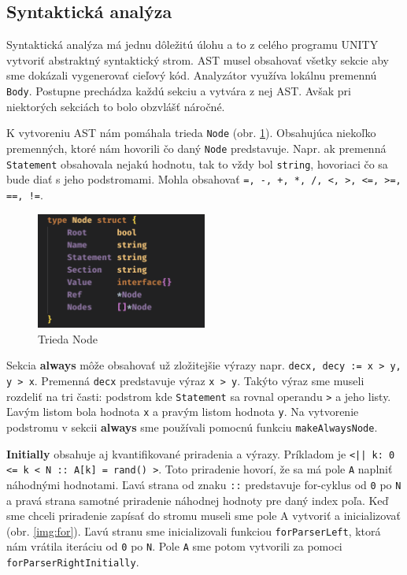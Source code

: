 \subsection{Syntaktická analýza}
Syntaktická analýza má jednu dôležitú úlohu a to z celého programu UNITY vytvoriť abstraktný syntaktický strom.
AST musel obsahovať všetky sekcie aby sme dokázali vygenerovať cieľový kód. Analyzátor využíva lokálnu 
premennú \texttt{Body}. Postupne prechádza každú sekciu a vytvára z nej AST. Avšak pri niektorých sekciách to
bolo obzvlášť náročné. 

K vytvoreniu AST nám pomáhala trieda \texttt{Node} (obr. \ref{img:node}). Obsahujúca niekoľko premenných, ktoré
nám hovorili čo daný \texttt{Node} predstavuje. Napr. ak premenná \texttt{Statement} obsahovala nejakú hodnotu,
tak to vždy bol \texttt{string}, hovoriaci čo sa bude diať s jeho podstromami. Mohla obsahovať 
\texttt{=, -, +, *, /, <, >, <=, >=, ==, !=}.

\begin{figure}[H]
    \centerline{\includegraphics[width=0.5\textwidth]{images/node}}
    \caption[Trieda Node]{Trieda Node}
    \label{img:node}
\end{figure}

Sekcia \textbf{always} môže obsahovať už zložitejšie výrazy napr.
\texttt{decx, decy := x > y, y > x}. Premenná \texttt{decx} predstavuje výraz \texttt{x > y}. 
Takýto výraz sme museli rozdeliť na tri časti: podstrom kde \texttt{Statement} sa rovnal operandu 
\texttt{>} a jeho listy. Ľavým listom bola hodnota \texttt{x} a pravým listom hodnota \texttt{y}. 
Na vytvorenie podstromu v sekcii \textbf{always} sme používali pomocnú funkciu \texttt{makeAlwaysNode}.

\textbf{Initially} obsahuje aj kvantifikované priradenia a výrazy. Príkladom je 
\texttt{<|| k: 0 <= k < N :: A[k] = rand() >}. Toto priradenie hovorí, že sa má pole \texttt{A} naplniť
náhodnými hodnotami. Ľavá strana od znaku \texttt{::} predstavuje for-cyklus od \texttt{0} po \texttt{N} 
a pravá strana samotné priradenie náhodnej hodnoty pre daný index poľa. Keď sme chceli priradenie zapísať 
do stromu museli sme pole A vytvoriť a inicializovať (obr. \ref{img:for}). Ľavú stranu sme 
inicializovali funkciou \texttt{forParserLeft}, ktorá nám vrátila iteráciu od \texttt{0} po \texttt{N}.
Pole \texttt{A} sme potom vytvorili za pomoci \texttt{forParserRightInitially}.

